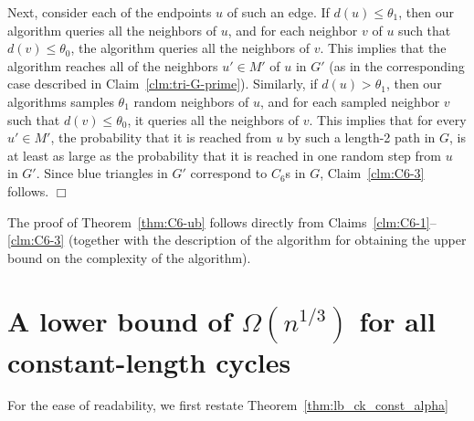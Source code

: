 \documentclass{article}
\newcommand{\eps}{\epsilon}
\newenvironment{proof}{\smallskip\noindent{\bf Proof:}}%
        {\hspace*{\fill}$\Box$\par}
\newtheorem{theorem}{Theorem}
\newcommand{\commentt}[1]{ {}}
\begin{document}
\begin{proof}
Next, consider each of the endpoints $u$ of such an edge. If $d(u)\leq \theta_1$, then our algorithm queries all the neighbors of $u$, and for each neighbor $v$ of $u$ such that $d(v) \leq \theta_0$, the algorithm queries all the neighbors of $v$. This implies that  the algorithm reaches all of the  neighbors $u'\in M'$ of $u$ in $G'$ (as in the corresponding case described in Claim~\ref{clm:tri-G-prime}). Similarly, if $d(u)> \theta_1$, then our algorithms samples $\theta_1$ random neighbors of $u$, and for each sampled neighbor $v$ such that $d(v) \leq \theta_0$, it queries all the neighbors of $v$. This implies that for every $u'\in M'$, the probability that it is reached from $u$ by such a length-2 path in $G$, is at least as large as the probability that it is reached in one random step from $u$ in $G'$.
Since blue triangles in $G'$ correspond to $C_6$s in $G$, Claim~\ref{clm:C6-3} follows.
\end{proof}

\medskip
The proof of Theorem~\ref{thm:C6-ub} follows directly from Claims~\ref{clm:C6-1}--\ref{clm:C6-3} (together with the description of the algorithm for obtaining the upper bound on the complexity of the algorithm).

\section{A lower bound of $\Omega(n^{1/3})$ for all constant-length cycles }\label{sec:Ck-lb}

For the ease of readability, we first restate Theorem~\ref{thm:lb_ck_const_alpha}
\end{document}
